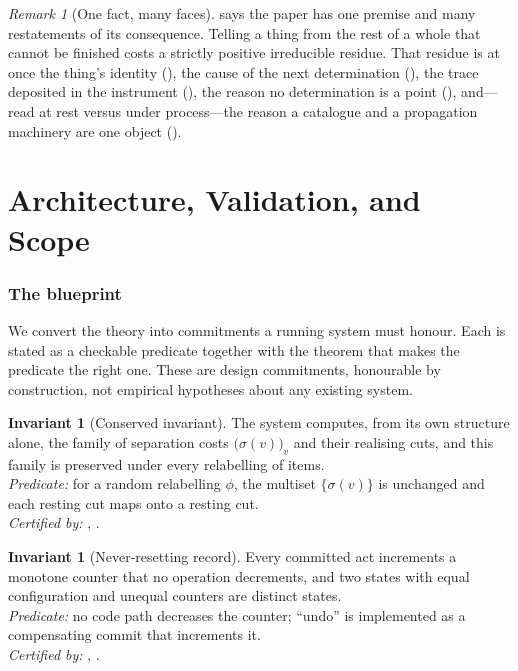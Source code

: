\documentclass[11pt,twocolumn,a4paper]{article}
\theoremstyle{dirthm}
\theoremstyle{definition}
\newtheorem{binv}[theorem]{Invariant}
\theoremstyle{remark}
\newtheorem{remark}[theorem]{Remark}
\newcommand{\str}{\sigma}
\newcommand{\set}[1]{\{#1\}}
\begin{document}
\begin{remark}[One fact, many faces]
\label{rem:master-reading}
 says the paper has one premise and many restatements of its
consequence. Telling a thing from the rest of a whole that cannot be finished
costs a strictly positive irreducible residue. That residue is at once the
thing's identity (), the cause of the next determination
(), the trace deposited in the instrument
(), the reason no determination is a point
(), and---read at rest versus under process---the reason a
catalogue and a propagation machinery are one object
().
\end{remark}

\part{Architecture, Validation, and Scope}
\label{part:arch}

\section{The blueprint}
\label{sec:blueprint}

We convert the theory into commitments a running system must honour. Each is
stated as a checkable predicate together with the theorem that makes the
predicate the right one. These are design commitments, honourable by
construction, not empirical hypotheses about any existing system.

\begin{binv}[Conserved invariant]
\label{binv:invariant}
The system computes, from its own structure alone, the family of separation
costs $\bigl(\str(v)\bigr)_v$ and their realising cuts, and this family is
preserved under every relabelling of items.\\
\emph{Predicate:} for a random relabelling $\phi$, the multiset
$\set{\str(v)}$ is unchanged and each resting cut maps onto a resting cut.\\
\emph{Certified by:} , .
\end{binv}

\begin{binv}[Never-resetting record]
\label{binv:record}
Every committed act increments a monotone counter that no operation
decrements, and two states with equal configuration and unequal counters are
distinct states.\\
\emph{Predicate:} no code path decreases the counter; ``undo'' is implemented
as a compensating commit that increments it.\\
\emph{Certified by:} , .
\end{binv}
\end{document}
